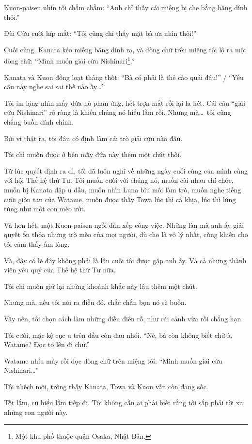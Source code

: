 \documentclass[../main.tex]{subfiles}
\begin{document}
Kuon-paisen nhìn tôi chằm chằm: ``Anh chỉ thấy cái miệng bị che bằng băng dính thôi.''

Đùi Cừu cười híp mắt: ``Tôi cũng chỉ thấy mặt bà ưa nhìn thôi!''

Cuối cùng, Kanata kéo miếng băng dính ra, và dòng chữ trên miệng tôi lộ ra một dòng chữ: ``Mình muốn giải cứu Nishinari\footnote{Một khu phố thuộc quận Osaka, Nhật Bản.}.''

Kanata và Kuon đồng loạt thảng thốt: ``Bà có phải là thẻ cào quái đâu!'' / ``Yêu cầu này nghe sai sai thế nào ấy\dots''

Tôi im lặng nhìn mấy đứa nó phản ứng, hết trợn mắt rồi lại la hét. Cái câu ``giải cứu Nishinari'' rõ ràng là khiến chúng nó hiểu lầm rồi. Nhưng mà\dots\ tôi cũng chẳng buồn đính chính.

Bởi vì thật ra, tôi đâu có định làm cái trò giải cứu nào đâu.

Tôi chỉ muốn được ở bên mấy đứa này thêm một chút thôi.

Từ lúc quyết định ra đi, tôi đã luôn nghĩ về những ngày cuối cùng của mình cùng với hội Thế hệ thứ Tư. Tôi muốn cười với chúng nó, muốn cãi nhau chí chóe, muốn bị Kanata đập u đầu, muốn nhìn Luna bĩu môi làm trò, muốn nghe tiếng cười giòn tan của Watame, muốn được thấy Towa lúc thì cà khịa, lúc thì lúng túng như một con mèo ướt.

Và hơn hết, một Kuon-paisen ngồi dàn xếp công việc. Những làn mà anh ấy giải quyết ổn thỏa những trò mèo của mọi người, dù cho là vô lý nhất, cũng khiến cho tôi cảm thấy ấm lòng.

Và, đây có lẽ đây không phải là lần cuối tôi được gặp anh ấy. Và cả những thành viên yêu quý của Thế hệ thứ Tư nữa.

Tôi chỉ muốn giữ lại những khoảnh khắc này lâu thêm một chút.

Nhưng mà, nếu tôi nói ra điều đó, chắc chắn bọn nó sẽ buồn.

Vậy nên, tôi chọn cách làm những điều điên rồ, như cái cảnh vừa rồi chẳng hạn.

Tôi cười, mặc kệ cục u trên đầu còn đau nhói. ``Nè, bà còn không biết chữ à, Watame? Đọc to lên đi chứ.''

Watame nhíu mày rồi đọc dòng chữ trên miệng tôi: ``Mình muốn giải cứu Nishinari\dots''

Tôi nhếch môi, trông thấy Kanata, Towa và Kuon vẫn còn đang sốc.

Tốt lắm, cứ hiểu lầm tiếp đi. Tôi không cần ai phải biết rằng tôi sắp phải rời xa những con người này.
\end{document}
